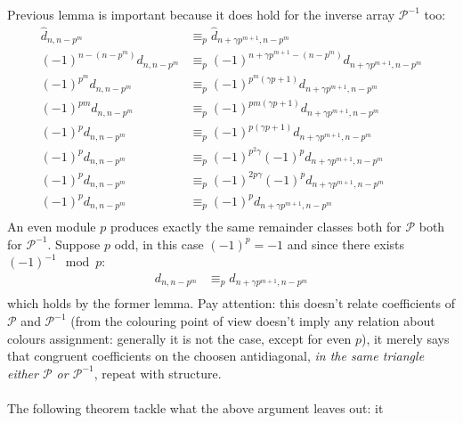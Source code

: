 \documentclass[10pt,a4paper]{article} %
\begin{document}
    Previous lemma is important because it does hold for the inverse array $\mathcal{P}^{-1}$ too:
    \begin{displaymath}
        \begin{split}
            \hat{d}_{n,n-p^{m}} &\equiv_{p} \hat{d}_{n+\gamma p^{m+1}, n-p^{m}} \\
            (-1)^{n-(n-p^{m})}d_{n,n-p^{m}} &\equiv_{p} (-1)^{n+\gamma p^{m+1}-(n-p^{m})}d_{n+\gamma p^{m+1}, n-p^{m}} \\
            (-1)^{p^{m}}d_{n,n-p^{m}} &\equiv_{p} (-1)^{p^{m}(\gamma p+1)}d_{n+\gamma p^{m+1}, n-p^{m}} \\
            (-1)^{p m}d_{n,n-p^{m}} &\equiv_{p} (-1)^{p{m}(\gamma p+1)}d_{n+\gamma p^{m+1}, n-p^{m}} \\
            (-1)^{p}d_{n,n-p^{m}} &\equiv_{p} (-1)^{p(\gamma p+1)}d_{n+\gamma p^{m+1}, n-p^{m}} \\
            (-1)^{p}d_{n,n-p^{m}} &\equiv_{p} (-1)^{p^2\gamma}(-1)^p d_{n+\gamma p^{m+1}, n-p^{m}} \\
            (-1)^{p}d_{n,n-p^{m}} &\equiv_{p} (-1)^{2p \gamma}(-1)^p d_{n+\gamma p^{m+1}, n-p^{m}} \\
            (-1)^{p}d_{n,n-p^{m}} &\equiv_{p} (-1)^p d_{n+\gamma p^{m+1}, n-p^{m}} \\
        \end{split}
    \end{displaymath}
    An even module $p$ produces exactly the same remainder classes both for $\mathcal{P}$ 
    both for $\mathcal{P}^{-1}$. Suppose $p$ odd, in this case $(-1)^{p} = -1$ and since there
    exists $(-1)^{-1}\mod p$:
    \begin{displaymath}
        \begin{split}
            d_{n,n-p^{m}} &\equiv_{p} d_{n+\gamma p^{m+1}, n-p^{m}} \\
        \end{split}
    \end{displaymath}
    which holds by the former lemma. Pay attention: this doesn't relate coefficients
    of $\mathcal{P}$ and $\mathcal{P}^{-1}$ (from the colouring point of view 
    doesn't imply any relation about colours assignment: generally it is not the case,
    except for even $p$), it merely says that 
    congruent coefficients on the choosen antidiagonal, \emph{in the same triangle
    either $\mathcal{P}$ or $\mathcal{P}^{-1}$}, repeat with structure.
    \\\\
    The following theorem tackle what the above argument leaves out: it 
\end{document}
